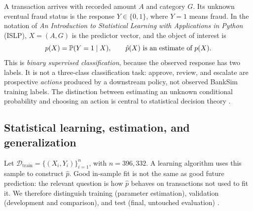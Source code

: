 \documentclass[11pt,a4paper]{article}
\begin{document}
A transaction arrives with recorded amount $A$ and category $G$. Its unknown eventual fraud status is the response $Y\in\{0,1\}$, where $Y=1$ means fraud. In the notation of \emph{An Introduction to Statistical Learning with Applications in Python} (ISLP), $X=(A,G)$ is the predictor vector, and the object of interest is
\begin{equation}\label{eq:target}p(X)=\mathbb P(Y=1\mid X),\qquad \hat p(X)\text{ is an estimate of }p(X).\end{equation}
This is \emph{binary supervised classification}, because the observed response has two labels. It is not a three-class classification task: approve, review, and escalate are prospective \emph{actions} produced by a downstream policy, not observed BankSim training labels. The distinction between estimating an unknown conditional probability and choosing an action is central to statistical decision theory \cite{berger1985}.

\subsection{Statistical learning, estimation, and generalization}
Let $\mathcal D_{\mathrm{train}}=\{(X_i,Y_i)\}_{i=1}^{n}$, with $n=396{,}332$. A learning algorithm uses this sample to construct $\hat p$. Good in-sample fit is not the same as good future prediction: the relevant question is how $\hat p$ behaves on transactions not used to fit it. We therefore distinguish training (parameter estimation), validation (development and comparison), and test (final, untouched evaluation) \cite[Chs.~2,5]{james2023}.
\end{document}
